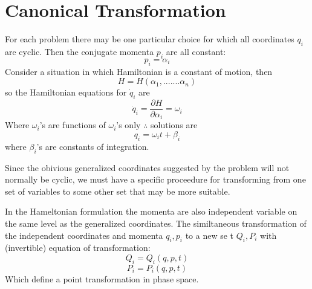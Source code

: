 \chapter{Canonical Transformation}
For each problem there may be one particular choice for which all coordinates $q_i$ are cyclic. Then the conjugate momenta $p_i$ are all constant:
$$p_i=\alpha_i$$
Consider a situation in which Hamiltonian is a constant of motion,
then 
$$H=H(\alpha_1,.......\alpha_n)$$
so the Hamiltonian equations for $\dot{q}_i$ are 
$$\dot{q}_i=\frac{\partial H}{\partial \alpha_i}=\omega_i$$
Where $\omega_i$'s are functions of $\omega_i$'s only 
$\therefore $ solutions are
$$ q_i=\omega_i t+\beta_i$$
where $\beta_i$'s are constants of integration.\\
\par Since the obivious generalized coordinates suggested by the problem will
not normally be cyclic, we must have a specific proceedure for transforming from one set of variables to some other set that may be more suitable.\\
\par In the Hameltonian formulation the momenta are also independent variable on the same level as the generalized coordinates. The similtaneous transformation of the independent coordinates and momenta $q_i,p_i$ to a new se t  $Q_i,P_i$ with (invertible) equation of transformation:
$$Q_i=Q_i (q,p,t)$$
$$P_i=P_i (q,p,t)$$
Which define a point transformation in phase space.